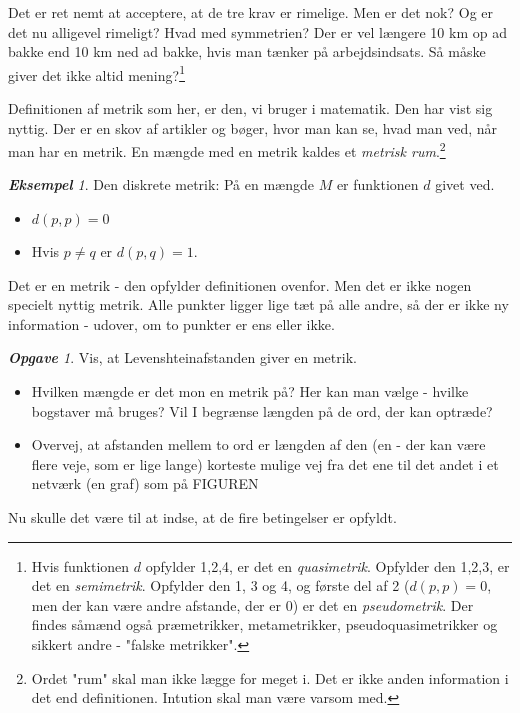 \documentclass[a4paper, 12pt]{article}
\theoremstyle{remark}
\newtheorem{Eksempel}{\textbf{Eksempel}}
\newtheorem{Opgave}{\textbf{Opgave}}
\begin{document}
Det er ret nemt at acceptere, at de tre krav er rimelige. Men er det nok? Og er det nu alligevel rimeligt? Hvad med symmetrien? Der er vel længere 10 km op ad bakke end 10 km ned ad bakke, hvis man tænker på arbejdsindsats. Så måske giver det ikke altid mening?\footnote{ Hvis funktionen $d$ opfylder 1,2,4, er det en \emph{quasimetrik}. Opfylder den 1,2,3, er det en \emph{semimetrik}. Opfylder den 1, 3 og 4, og første del af 2 ($d(p,p)=0$, men der kan være andre afstande, der er $0$)  er det en \emph{pseudometrik}.  Der findes såmænd også præmetrikker, metametrikker, pseudoquasimetrikker og sikkert andre - "falske metrikker". }

Definitionen af metrik som her, er den, vi bruger i matematik. Den har vist sig nyttig. Der er en skov af artikler og bøger, hvor man kan se, hvad man ved, når man har  en metrik. En mængde med en metrik kaldes et \emph{metrisk rum}.\footnote{Ordet "rum"  skal man ikke lægge for meget i. Det er ikke anden information i det end definitionen. Intution skal man være varsom med.}
\begin{Eksempel}
Den diskrete metrik: På en mængde $M$ er funktionen $d$ givet ved. 
\begin{itemize}
\item $d(p,p)=0$
\item Hvis $p\neq q$ er $d(p,q)=1$.
\end{itemize}
Det er en metrik - den opfylder definitionen ovenfor. Men det er ikke nogen specielt nyttig metrik. Alle punkter ligger lige tæt på alle andre, så der er ikke ny information - udover, om  to punkter er ens eller ikke.
\end{Eksempel}
\begin{Opgave}\label{Opg:Levensh} Vis, at Levenshteinafstanden giver en metrik. 
\begin{itemize}
\item Hvilken mængde er det mon en metrik på? Her kan man vælge - hvilke bogstaver må bruges? Vil I begrænse længden på de ord, der kan optræde? 
\item Overvej, at afstanden mellem to ord er længden af den (en - der kan være flere veje, som er lige lange)  korteste mulige vej fra det ene til det andet i et netværk (en graf) som på FIGUREN

\end{itemize}
Nu skulle det være til at indse, at de fire betingelser er opfyldt. 
\end{Opgave}
\end{document}
